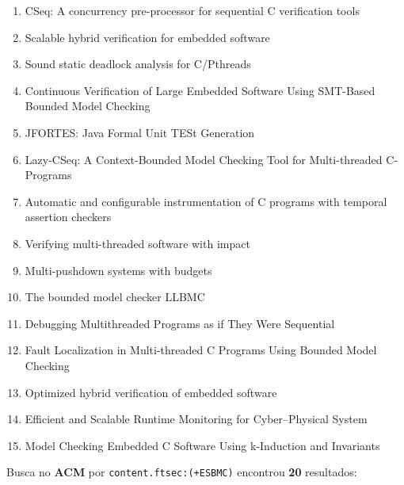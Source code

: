 \begin{enumerate}
\item CSeq: A concurrency pre-processor for sequential C verification tools
\item Scalable hybrid verification for embedded software
\item Sound static deadlock analysis for C/Pthreads
\item Continuous Verification of Large Embedded Software Using SMT-Based Bounded Model Checking
\item JFORTES: Java Formal Unit TESt Generation
\item Lazy-CSeq: A Context-Bounded Model Checking Tool for Multi-threaded C-Programs
\item Automatic and configurable instrumentation of C programs with temporal assertion checkers
\item Verifying multi-threaded software with impact
\item Multi-pushdown systems with budgets
\item The bounded model checker LLBMC
\item Debugging Multithreaded Programs as if They Were Sequential
\item Fault Localization in Multi-threaded C Programs Using Bounded Model Checking
\item Optimized hybrid verification of embedded software
\item Efficient and Scalable Runtime Monitoring for Cyber--Physical System
\item Model Checking Embedded C Software Using k-Induction and Invariants
\end{enumerate}

Busca no {\bf ACM} por
\texttt{content.ftsec:(+ESBMC)}
encontrou {\bf 20}
resultados:

